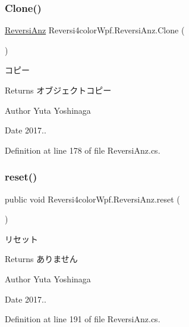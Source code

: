 \subsubsection{\texorpdfstring{Clone()}{Clone()}}
{\footnotesize\ttfamily \hyperlink{class_reversi4color_wpf_1_1_reversi_anz}{Reversi\+Anz} Reversi4color\+Wpf.\+Reversi\+Anz.\+Clone (\begin{DoxyParamCaption}{ }\end{DoxyParamCaption})}



コピー 

\begin{DoxyReturn}{Returns}
オブジェクトコピー 
\end{DoxyReturn}
\begin{DoxyAuthor}{Author}
Yuta Yoshinaga 
\end{DoxyAuthor}
\begin{DoxyDate}{Date}
2017.. 
\end{DoxyDate}


Definition at line 178 of file Reversi\+Anz.\+cs.

\mbox{\label{class_reversi4color_wpf_1_1_reversi_anz_a5310f56d39d5910068dd19eff79bec1f}} 
\subsubsection{\texorpdfstring{reset()}{reset()}}
{\footnotesize\ttfamily public void Reversi4color\+Wpf.\+Reversi\+Anz.\+reset (\begin{DoxyParamCaption}{ }\end{DoxyParamCaption})}



リセット 

\begin{DoxyReturn}{Returns}
ありません 
\end{DoxyReturn}
\begin{DoxyAuthor}{Author}
Yuta Yoshinaga 
\end{DoxyAuthor}
\begin{DoxyDate}{Date}
2017.. 
\end{DoxyDate}


Definition at line 191 of file Reversi\+Anz.\+cs.



